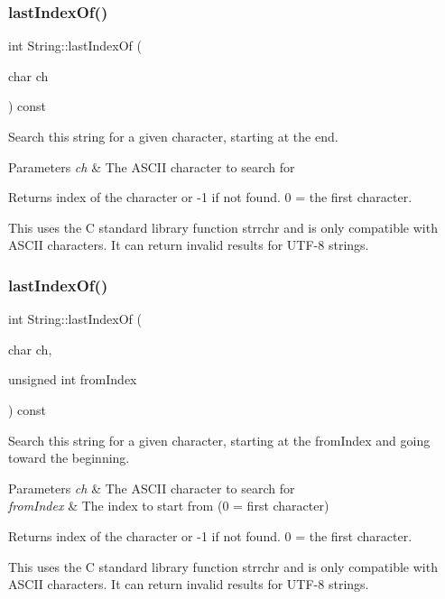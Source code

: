 \subsubsection{\texorpdfstring{last\+Index\+Of()}{lastIndexOf()}\hspace{0.1cm}{\footnotesize\ttfamily [1/4]}}
{\footnotesize\ttfamily int String\+::last\+Index\+Of (\begin{DoxyParamCaption}\item[{char}]{ch }\end{DoxyParamCaption}) const}



Search this string for a given character, starting at the end. 


\begin{DoxyParams}{Parameters}
{\em ch} & The A\+S\+C\+II character to search for\\
\hline
\end{DoxyParams}
\begin{DoxyReturn}{Returns}
index of the character or -\/1 if not found. 0 = the first character.
\end{DoxyReturn}
This uses the C standard library function strrchr and is only compatible with A\+S\+C\+II characters. It can return invalid results for U\+T\+F-\/8 strings. \mbox{\label{class_string_af9b32bb5cf68844c04792b4368f69883}} 
\subsubsection{\texorpdfstring{last\+Index\+Of()}{lastIndexOf()}\hspace{0.1cm}{\footnotesize\ttfamily [2/4]}}
{\footnotesize\ttfamily int String\+::last\+Index\+Of (\begin{DoxyParamCaption}\item[{char}]{ch,  }\item[{unsigned int}]{from\+Index }\end{DoxyParamCaption}) const}



Search this string for a given character, starting at the from\+Index and going toward the beginning. 


\begin{DoxyParams}{Parameters}
{\em ch} & The A\+S\+C\+II character to search for\\
\hline
{\em from\+Index} & The index to start from (0 = first character)\\
\hline
\end{DoxyParams}
\begin{DoxyReturn}{Returns}
index of the character or -\/1 if not found. 0 = the first character.
\end{DoxyReturn}
This uses the C standard library function strrchr and is only compatible with A\+S\+C\+II characters. It can return invalid results for U\+T\+F-\/8 strings. \mbox{\label{class_string_aa696010f90d06e0caceeb847ab3ce689}} 
